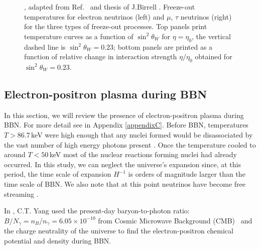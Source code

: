 \begin{figure}[ht]
\caption{, adapted from Ref.~\cite{Birrell:2014uka} and thesis of J.Birrell \cite{Birrell:2014ona}. Freeze-out temperatures for electron neutrinos (left) and $\mu$, $\tau$ neutrinos (right) for the three types of freeze-out processes. Top panels print temperature curves as a function of $\sin^2\theta_W$ for $\eta=\eta_0$, the vertical dashed line is $\sin^2\theta_W=0.23$; bottom panels are printed as a function of relative change in interaction strength $\eta/\eta_0$ obtained for $\sin^2\theta_W=0.23$.}
\label{fig:freezeoutT}
 \end{figure}

\subsection{Electron-positron plasma during BBN}\label{sec:density}
In this section, we will review the presence of electron-positron plasma during BBN. For more detail see \cite{Grayson:2023flr} in Appendix \ref{appendixC}. Before BBN, temperatures $T>86.7\,$keV were high enough that any nuclei formed would be disassociated by the vast number of high energy photons present \cite{Pitrou:2018cgg}. Once the temperature cooled to around $T<50\,$keV most of the nuclear reactions forming nuclei had already occurred. In this study, we can neglect the universe's expansion since, at this period, the time scale of expansion $H^{-1}$ is orders of magnitude larger than the time scale of BBN. We also note that at this point neutrinos have become free streaming \cite{Birrell:2012gg}.

In \cite{Grayson:2022asf}, C.T. Yang used the present-day baryon-to-photon ratio: $B/N_\gamma =n_B/n_\gamma= 6.05\times10^{-10}$ from Cosmic Microwave Background (CMB)~\cite{ParticleDataGroup:2022pth} and the charge neutrality of the universe to find the electron-positron chemical potential and density during BBN.


